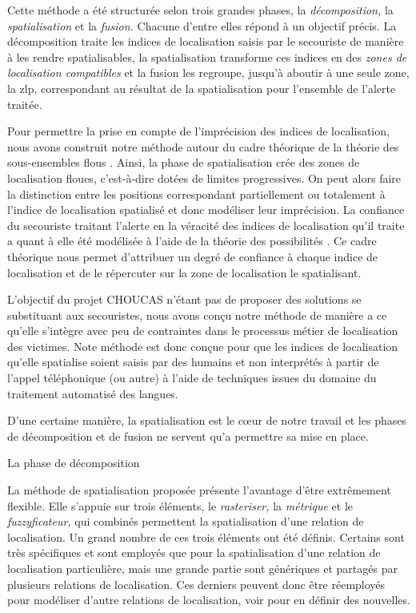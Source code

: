 Cette méthode a été structurée selon trois grandes phases, la
\emph{décomposition,} la \emph{spatialisation} et la \emph{fusion.}
Chacune d'entre elles répond à un objectif précis. La décomposition
traite les indices de localisation saisis par le secouriste de manière
à les rendre spatialisables, la spatialisation transforme ces indices
en des \emph{zones de localisation compatibles} et la fusion les
regroupe, jusqu'à aboutir à une seule zone, la \ac{zlp}, correspondant
au résultat de la spatialisation pour l'ensemble de l'alerte traitée.

Pour permettre la prise en compte de l'imprécision des indices de
localisation, nous avons construit notre méthode autour du cadre
théorique de la théorie des sous-ensembles flous
\autocite{Zadeh1965}. Ainsi, la phase de spatialisation crée des zones
de localisation floues, c'est-à-dire dotées de limites
progressives. On peut alors faire la distinction entre les positions
correspondant partiellement ou totalement à l'indice de localisation
spatialisé et donc modéliser leur imprécision.
%
La confiance du secouriste traitant l'alerte en la véracité des
indices de localisation qu'il traite a quant à elle été modélisée à
l'aide de la théorie des possibilités \autocite{Zadeh1978}. Ce cadre
théorique nous permet d'attribuer un degré de confiance à chaque
indice de localisation et de le répercuter sur la zone de localisation
le spatialisant.

L'objectif du projet CHOUCAS n'étant pas de proposer des solutions se
substituant aux secouristes, nous avons conçu notre méthode de manière
a ce qu'elle s'intègre avec peu de contraintes dans le processus
métier de localisation des victimes. Note méthode est donc conçue pour
que les indices de localisation qu'elle spatialise soient saisis par
des humains et non interprétés à partir de l'appel téléphonique (ou
autre) à l'aide de techniques issues du domaine du traitement
automatisé des langues. 


D'une certaine manière, la spatialisation est le cœur de notre travail
et les phases de décomposition et de fusion ne servent qu'a permettre
sa mise en place.


La phase de décomposition

La méthode de spatialisation proposée présente l'avantage d'être
extrêmement flexible. Elle s'appuie sur trois éléments, le
\emph{rasteriser,} la \emph{métrique} et le \emph{fuzzyficateur,} qui
combinés permettent la spatialisation d'une relation de
localisation. Un grand nombre de ces trois éléments ont été
définis. Certains sont très spécifiques et sont employés que pour la
spatialisation d'une relation de localisation particulière, mais une
grande partie sont génériques et partagés par plusieurs relations de
localisation. Ces derniers peuvent donc être réemployés pour modéliser
d'autre relations de localisation, voir pour en définir des nouvelles.

